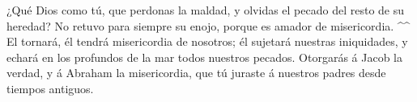  ¿Qué Dios como tú, que perdonas la maldad, y olvidas el
pecado del resto de su heredad? No retuvo para siempre su enojo, porque
es amador de misericordia. \^{}\^{}  El tornará, él tendrá
misericordia de nosotros; él sujetará nuestras iniquidades, y echará en
los profundos de la mar todos nuestros pecados.  Otorgarás
á Jacob la verdad, y á Abraham la misericordia, que tú juraste á
nuestros padres desde tiempos antiguos.
